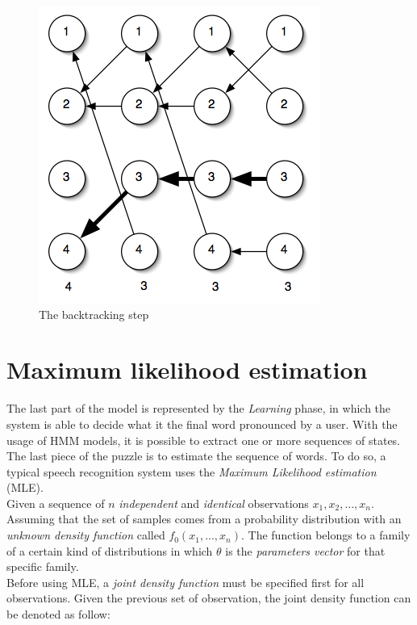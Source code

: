 \begin{figure}[!ht]
	\centering
	\includegraphics[scale=0.8]{Figures/hmm_backtrack.png}
	\caption{The backtracking step \cite{hmm_tutorial}}
	\label{fig:hmm_backtrack}
\end{figure}


\section{Maximum likelihood estimation}
\label{sec:mle}
The last part of the model is represented by the \textit{Learning} phase, in which the system is able to decide what it the final word pronounced by a user. With the usage of HMM models, it is possible to extract one or more sequences of states. The last piece of the puzzle is to estimate the sequence of words. To do so, a typical speech recognition system uses the \textit{Maximum Likelihood estimation} (MLE). \\

\noindent Given a sequence of $n$ \textit{independent} and \textit{identical} observations $x_{1}, x_{2}, ... , x_{n}$. Assuming that the set of samples comes from a probability distribution with an \textit{unknown density function} called $f_{0}(x_{1}, ... , x_{n})$. The function belongs to a family of a certain kind of distributions in which $\theta$ is the \textit{parameters vector} for that specific family. \\

\noindent Before using MLE, a \textit{joint density function} must be specified first for all observations. Given the previous set of observation, the joint density function can be denoted as follow:

